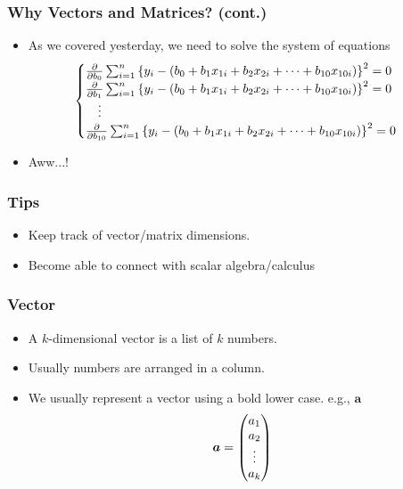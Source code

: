 \documentclass[pdflatex, 12pt]{beamer}
\begin{document}
\begin{frame}
\frametitle{Why Vectors and Matrices? (cont.)}
\begin{itemize}
\item As we covered yesterday, we need to solve the system of equations
 \begin{eqnarray}
 \begin{cases}
 \frac{\partial}{\partial b_{0}} \sum_{i = 1}^n \left\{y_i - (b_0 + b_1 x_{1i} + b_2 x_{2i} + \cdots + b_{10} x_{10i})\right\}^2 = 0 \\
 \frac{\partial}{\partial b_{1}} \sum_{i = 1}^n \left\{y_i - (b_0 + b_1 x_{1i} + b_2 x_{2i} + \cdots + b_{10} x_{10i})\right\}^2 = 0 \\
 \ \ \ \vdots \\
 \frac{\partial}{\partial b_{10}} \sum_{i = 1}^n \left\{y_i - (b_0 + b_1 x_{1i} + b_2 x_{2i} + \cdots + b_{10} x_{10i})\right\}^2 = 0 \notag
 \end{cases}
 \end{eqnarray}
\vspace{0.2cm}
\item Aww...!
\end{itemize}
\end{frame}

\begin{frame}
\frametitle{Tips}
\begin{itemize}
\item Keep track of vector/matrix dimensions.
\vspace{0.4cm}
\item Become able to connect with scalar algebra/calculus
\end{itemize}
\end{frame}

\begin{frame}
\frametitle{Vector}
\begin{itemize}
\item A $k$-dimensional vector is a list of $k$ numbers.
\vspace{0.4cm}
\item Usually numbers are arranged in a column.
\vspace{0.4cm}
\item We usually represent a vector using a bold lower case. e.g., $\bm{a}$ 
 \begin{equation}
 \bm{a} = \begin{pmatrix}
 a_1 \\
 a_2 \\
 \vdots \\
 a_k
 \end{pmatrix} \notag
 \end{equation}
\end{itemize}
\end{frame}
\end{document}
